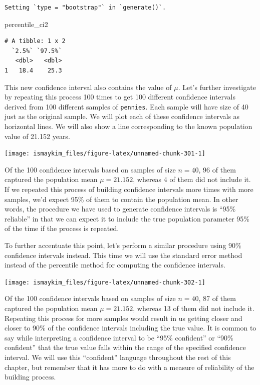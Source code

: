 \documentclass[12pt, krantz2,]{krantz}
\makeatletter
\newenvironment{Shaded}{\begin{snugshade}}{\end{snugshade}}
\newcommand{\NormalTok}[1]{#1}
\newenvironment{kframe}{%
\medskip{}
\setlength{\fboxsep}{.8em}
 \def\at@end@of@kframe{}%
 \ifinner\ifhmode%
  \def\at@end@of@kframe{\end{minipage}}%
  \begin{minipage}{\columnwidth}%
 \fi\fi%
 \def\FrameCommand##1{\hskip\@totalleftmargin \hskip-\fboxsep
 \colorbox{shadecolor}{##1}\hskip-\fboxsep
     \hskip-\linewidth \hskip-\@totalleftmargin \hskip\columnwidth}%
 \MakeFramed {\advance\hsize-\width
   \@totalleftmargin\z@ \linewidth\hsize
   \@setminipage}}%
 {\par\unskip\endMakeFramed%
 \at@end@of@kframe}
\renewenvironment{Shaded}{\begin{kframe}}{\end{kframe}}
\makeatother
\begin{document}
\begin{verbatim}
Setting `type = "bootstrap"` in `generate()`.
\end{verbatim}

\begin{Shaded}
\begin{Highlighting}[]
\NormalTok{percentile_ci2}
\end{Highlighting}
\end{Shaded}

\begin{verbatim}
# A tibble: 1 x 2
  `2.5%` `97.5%`
   <dbl>   <dbl>
1   18.4    25.3
\end{verbatim}

This new confidence interval also contains the value of \(\mu\). Let's further investigate by repeating this process 100 times to get 100 different confidence intervals derived from 100 different samples of \texttt{pennies}. Each sample will have size of 40 just as the original sample. We will plot each of these confidence intervals as horizontal lines. We will also show a line corresponding to the known population value of 21.152 years.

\begin{center}\texttt{[image: ismaykim\_files/figure-latex/unnamed-chunk-301-1]} \end{center}

Of the 100 confidence intervals based on samples of size \(n = 40\), 96 of them captured the population mean \(\mu = 21.152\), whereas 4 of them did not include it. If we repeated this process of building confidence intervals more times with more samples, we'd expect 95\% of them to contain the population mean. In other words, the procedure we have used to generate confidence intervals is ``95\% reliable'' in that we can expect it to include the true population parameter 95\% of the time if the process is repeated.

To further accentuate this point, let's perform a similar procedure using 90\% confidence intervals instead. This time we will use the standard error method instead of the percentile method for computing the confidence intervals.

\begin{center}\texttt{[image: ismaykim\_files/figure-latex/unnamed-chunk-302-1]} \end{center}

Of the 100 confidence intervals based on samples of size \(n = 40\), 87 of them captured the population mean \(\mu = 21.152\), whereas 13 of them did not include it. Repeating this process for more samples would result in us getting closer and closer to 90\% of the confidence intervals including the true value. It is common to say while interpreting a confidence interval to be ``95\% confident'' or ``90\% confident'' that the true value falls within the range of the specified confidence interval. We will use this ``confident'' language throughout the rest of this chapter, but remember that it has more to do with a measure of reliability of the building process.
\end{document}
